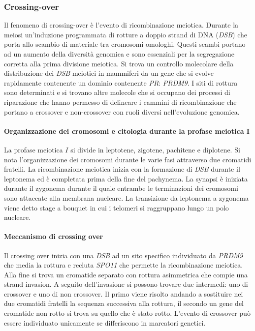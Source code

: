 \subsubsection{Crossing-over}
Il fenomeno di crossing-over \`e l'evento di ricombinazione meiotica. Durante la meiosi un'induzione programmata di rotture a doppio strand di DNA (\emph{DSB}) che porta allo scambio
di materiale tra cromosomi omologhi. Questi scambi portano ad un aumento della diversit\`a genomica e sono essenziali per la segregazione corretta alla prima divisione meiotica. Si trova
un controllo molecolare della distribuzione dei \emph{DSB} meiotici in mammiferi da un gene che si evolve rapidamente contenente un dominio contenente \emph{PR}: \emph{PRDM9}. I siti 
di rottura sono determinati e si trovano altre molecole che si occupano dei processi di riparazione che hanno permesso di delineare i cammini di ricombinazione che portano a crossover
e non-crossover con ruoli diversi nell'evoluzione genomica. 
\paragraph{Organizzazione dei cromosomi e citologia durante la profase meiotica $\mathbf{I}$}
La profase meiotica $I$ si divide in leptotene, zigotene, pachitene e diplotene. Si nota l'organizzazione dei cromosomi durante le varie fasi attraverso due cromatidi fratelli. La 
ricombinazione meiotica inizia con la formazione di \emph{DSB} durante il leptonema ed \`e completata prima della fine del pachynema. La synapsi \`e iniziata durante il zygonema durante
il quale entrambe le terminazioni dei cromosomi sono attaccate alla membrana nucleare. La transizione da leptonema a zygonema viene detto stage a bouquet in cui i telomeri si 
raggruppano lungo un polo nucleare. 
\paragraph{Meccanismo di crossing over}
Il crossing over inizia con una \emph{DSB} ad un sito specifico individuato da \emph{PRDM9} che media la rottura e recluta \emph{SPO11} che permette la ricombinazione meiotica. Alla fine
si trova un cromatide separato con rottura asimmetrica che compie una strand invasion. A seguito dell'invasione si possono trovare due intermedi: uno di crossover e uno di non crossover.
Il primo viene risolto andando a sostituire nei due cromatidi fratelli la sequenza successiva alla rottura, il secondo un gene del cromatide non rotto si trova su quello che \`e stato 
rotto. L'evento di crossover pu\`o essere individuato unicamente se differiscono in marcatori genetici. 
